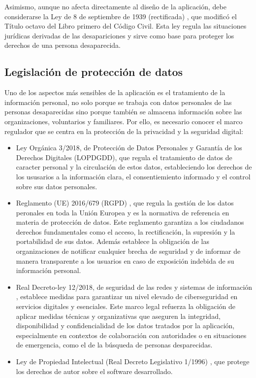     Asimismo, aunque no afecta directamente al diseño de la aplicación, debe considerarse la Ley de 8 de septiembre de 1939 (rectificada) \cite{ley_ausencia_1939},  que modificó el Título octavo del Libro primero del Código Civil. Esta ley regula las situaciones jurídicas derivadas de las desapariciones y sirve como base para proteger los derechos de una persona desaparecida.
    
    \subsection{Legislación de protección de datos}
    Uno de los aspectos más sensibles de la aplicación es el tratamiento de la información personal, no solo porque se trabaja con datos personales de las personas desaparecidas sino porque también se almacena información sobre las organizaciones, voluntarios y familiares. Por ello, es necesario conocer el marco regulador que se centra en la protección de la privacidad y la seguridad digital:
    \begin{itemize}
        \item Ley Orgánica 3/2018, de Protección de Datos Personales y Garantía de los Derechos Digitales (LOPDGDD)\cite{ley_organica_3_2018}, que regula el tratamiento de datos de caracter personal y la circulación de estos datos, estableciendo los derechos de los ususarios a la información clara, el consentiemiento informado y el control sobre sus datos personales.
        
        \item Reglamento (UE) 2016/679 (RGPD) \cite{rgpd_eurlex}, que regula la gestión de los datos peronales en toda la Unión Europea y es la normativa de referencia en materia de protección de datos. Este reglamento garantiza a los ciudadanos derechos fundamentales como el acceso, la rectificación, la supresión y la portabilidad de sus datos. Además establece la obligación de las organizaciones de notificar cualquier brecha de seguridad y de informar de manera transparente a los usuarios en caso de exposición indebida de su información personal.

        \item Real Decreto-ley 12/2018, de seguridad de las redes y sistemas de información \cite{RD_ley_12_2018}, establece medidas para garantizar un nivel elevado de ciberseguridad en servicios digitales y esenciales. Este marco legal refuerza la obligación de aplicar medidas técnicas y organizativas que aseguren la integridad, disponibilidad y confidencialidad de los datos tratados por la aplicación, especialmente en contextos de colaboración con autoridades o en situaciones de emergencia, como el de la búsqueda de personas desparecidas. 
        
        \item Ley de Propiedad Intelectual (Real Decreto Legislativo 1/1996) \cite{RD_leyPropiedadIntelectual}, que protege los derechos de autor sobre el software desarrollado. 
    \end{itemize}

